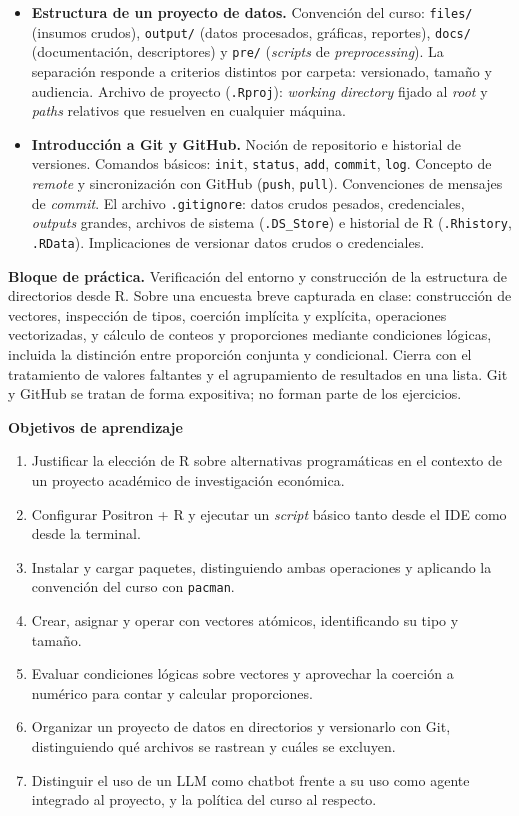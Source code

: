 \documentclass[11pt,letterpaper]{article}
\newcommand{\orange}[1]{{\color{redorange}#1}}
\newcommand{\practica}[1]{%
  \medskip\noindent\textbf{\orange{Bloque de práctica.}} #1\par%
}
\begin{document}
\begin{itemize}[leftmargin=*, itemsep=2pt]
    \item \textbf{Estructura de un proyecto de datos.} Convención del curso: \texttt{files/} (insumos crudos), \texttt{output/} (datos procesados, gráficas, reportes), \texttt{docs/} (documentación, descriptores) y \texttt{pre/} (\textit{scripts} de \textit{preprocessing}). La separación responde a criterios distintos por carpeta: versionado, tamaño y audiencia. Archivo de proyecto (\texttt{.Rproj}): \textit{working directory} fijado al \textit{root} y \textit{paths} relativos que resuelven en cualquier máquina.
    \item \textbf{Introducción a Git y GitHub.} Noción de repositorio e historial de versiones. Comandos básicos: \texttt{init}, \texttt{status}, \texttt{add}, \texttt{commit}, \texttt{log}. Concepto de \textit{remote} y sincronización con GitHub (\texttt{push}, \texttt{pull}). Convenciones de mensajes de \textit{commit}. El archivo \texttt{.gitignore}: datos crudos pesados, credenciales, \textit{outputs} grandes, archivos de sistema (\texttt{.DS\_Store}) e historial de R (\texttt{.Rhistory}, \texttt{.RData}). Implicaciones de versionar datos crudos o credenciales.
\end{itemize}

\practica{Verificación del entorno y construcción de la estructura de directorios desde R. Sobre una encuesta breve capturada en clase: construcción de vectores, inspección de tipos, coerción implícita y explícita, operaciones vectorizadas, y cálculo de conteos y proporciones mediante condiciones lógicas, incluida la distinción entre proporción conjunta y condicional. Cierra con el tratamiento de valores faltantes y el agrupamiento de resultados en una lista. Git y GitHub se tratan de forma expositiva; no forman parte de los ejercicios.}

\medskip
\noindent\textbf{Objetivos de aprendizaje}
\begin{enumerate}[leftmargin=*, itemsep=1pt]
    \item Justificar la elección de R sobre alternativas programáticas en el contexto de un proyecto académico de investigación económica.
    \item Configurar Positron + R y ejecutar un \textit{script} básico tanto desde el IDE como desde la terminal.
    \item Instalar y cargar paquetes, distinguiendo ambas operaciones y aplicando la convención del curso con \texttt{pacman}.
    \item Crear, asignar y operar con vectores atómicos, identificando su tipo y tamaño.
    \item Evaluar condiciones lógicas sobre vectores y aprovechar la coerción a numérico para contar y calcular proporciones.
    \item Organizar un proyecto de datos en directorios y versionarlo con Git, distinguiendo qué archivos se rastrean y cuáles se excluyen.
    \item Distinguir el uso de un LLM como chatbot frente a su uso como agente integrado al proyecto, y la política del curso al respecto.
\end{enumerate}
\end{document}
